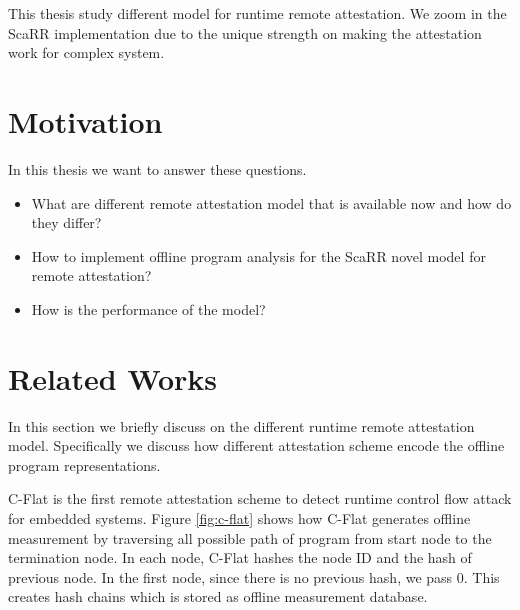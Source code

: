 This thesis study different model for runtime remote attestation. We zoom in the
ScaRR implementation due to the unique strength on making the attestation work
for complex system.

\section{Motivation}

In this thesis we want to answer these questions.
\begin{itemize}
    \item What are different remote attestation model that is available now and
    how do they differ?
    \item How to implement offline program analysis for the ScaRR novel model
    for remote attestation?
    \item How is the performance of the model?
\end{itemize}

\section{Related Works}

In this section we briefly discuss on the different runtime remote attestation
model. Specifically we discuss how different attestation scheme encode the
offline program representations.

C-Flat \cite{aberaCFLATControlFlowAttestation2016} is the first remote
attestation scheme to detect runtime control flow attack for embedded systems.
Figure \ref{fig:c-flat} shows how C-Flat generates offline measurement by
traversing all possible path of program from start node to the termination node.
In each node, C-Flat hashes the node ID and the hash of previous node. In the
first node, since there is no previous hash, we pass 0. This creates hash chains
which is stored as offline measurement database.

